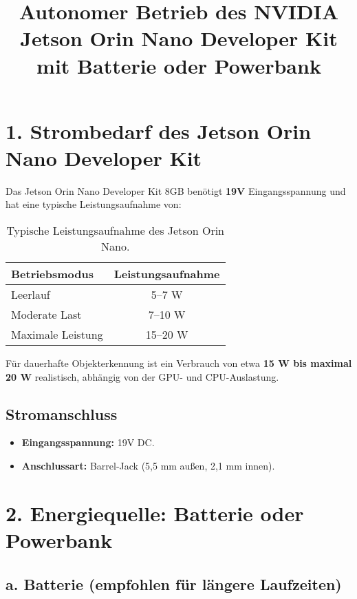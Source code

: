 \documentclass[a4paper,12pt]{article}
\title{Autonomer Betrieb des NVIDIA Jetson Orin Nano Developer Kit mit Batterie oder Powerbank}
\author{}
\date{}
\begin{document}
\maketitle

\section*{1. Strombedarf des Jetson Orin Nano Developer Kit}

Das Jetson Orin Nano Developer Kit 8GB benötigt \textbf{19V} Eingangsspannung und hat eine typische Leistungsaufnahme von:

\begin{table}[h!]
    \centering
    \begin{tabular}{|l|c|}
        \hline
        \textbf{Betriebsmodus} & \textbf{Leistungsaufnahme} \\
        \hline
        Leerlauf & 5--7 W \\
        Moderate Last & 7--10 W \\
        Maximale Leistung & 15--20 W \\
        \hline
    \end{tabular}
    \caption{Typische Leistungsaufnahme des Jetson Orin Nano.}
\end{table}

Für dauerhafte Objekterkennung ist ein Verbrauch von etwa \textbf{15 W bis maximal 20 W} realistisch, abhängig von der GPU- und CPU-Auslastung.

\subsection*{Stromanschluss}
\begin{itemize}
    \item \textbf{Eingangsspannung:} 19V DC.
    \item \textbf{Anschlussart:} Barrel-Jack (5,5 mm außen, 2,1 mm innen).
\end{itemize}

\section*{2. Energiequelle: Batterie oder Powerbank}

\subsection*{a. Batterie (empfohlen für längere Laufzeiten)}
\end{document}
